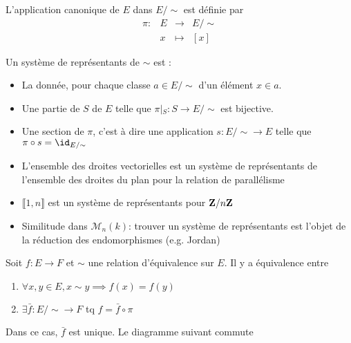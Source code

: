 \begin{dfn}
L'application canonique de $E$ dans  $E / \sim$ est définie par \[
\begin{array}{rrcl}
    \pi:& E & \longrightarrow & E / \sim \\
        & x & \longmapsto & \displaystyle [x]
\end{array}
\]
\end{dfn}

\begin{dfn}
    Un système de représentants de $\sim$ est : \begin{itemize}
        \item La donnée, pour chaque classe  $a \in  E / \sim$ d'un élément $x \in  a$.
        \item Une partie de $S$ de  $E$ telle que  $\pi\left|_{S}\right.:S\longrightarrow E / \sim$ est bijective.
        \item Une section de $\pi$, c'est à dire une application $s: E / \sim \longrightarrow E$ telle que  $\pi\circ s=\id_{E / \sim}$
    \end{itemize}
\end{dfn}

\begin{ex}
    \begin{itemize}
        \item L'ensemble des droites vectorielles est un système de représentants de l'ensemble des droites du plan pour la relation de parallélisme
        \item $\llbracket 1, n \rrbracket $ est un système de représentants pour $\mathbf Z/n\mathbf Z$ 
        \item Similitude dans $\mathcal M_n(k)$: trouver un système de représentants est l'objet de la réduction des endomorphismes (e.g. Jordan)
    \end{itemize}
\end{ex}

\begin{thm}
Soit $f:E\longrightarrow F$ et  $\sim$ une relation d'équivalence sur  $E$. Il y a équivalence entre  \begin{enumerate}
    \item $\forall  x, y \in  E, x\sim y \implies f(x)=f(y)$
    \item $ \exists  \bar f: E / \sim \longrightarrow F$ tq $f = \bar f\circ \pi$
\end{enumerate}
Dans ce cas, $\bar f$ est unique. Le diagramme suivant commute
\begin{center}
\end{center}
\end{thm}

